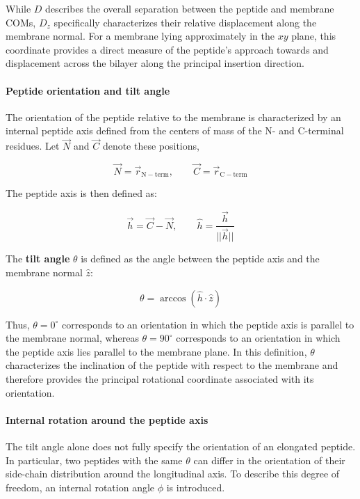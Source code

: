 While $D$ describes the overall separation between the peptide and membrane COMs, $D_z$ specifically characterizes their relative displacement along the membrane normal. For a membrane lying approximately in the $xy$ plane, this coordinate provides a direct measure of the peptide's approach towards and displacement across the bilayer along the principal insertion direction.

\paragraph{Peptide orientation and tilt angle}

The orientation of the peptide relative to the membrane is characterized by an internal peptide axis defined from the centers of mass of the N- and C-terminal residues. Let $\vec{N}$ and $\vec{C}$ denote these positions,

\begin{equation}
\vec{N} = \vec{r}_{\mathrm{N-term}},
\qquad
\vec{C} = \vec{r}_{\mathrm{C-term}}
\end{equation}

The peptide axis is then defined as:

\begin{equation}
\vec{h} = \vec{C}-\vec{N},
\qquad
\hat{h} = \frac{\vec{h}}{||\vec{h}||}
\end{equation}

The \textbf{tilt angle} $\theta$ is defined as the angle between the peptide axis and the membrane normal $\hat{z}$:

\begin{equation}
\theta =
\arccos\left(\hat{h}\cdot\hat{z}\right)
\end{equation}

Thus, $\theta=0^\circ$ corresponds to an orientation in which the peptide axis is parallel to the membrane normal, whereas $\theta=90^\circ$ corresponds to an orientation in which the peptide axis lies parallel to the membrane plane. In this definition, $\theta$ characterizes the inclination of the peptide with respect to the membrane and therefore provides the principal rotational coordinate associated with its orientation.

\paragraph{Internal rotation around the peptide axis}

The tilt angle alone does not fully specify the orientation of an elongated peptide. In particular, two peptides with the same $\theta$ can differ in the orientation of their side-chain distribution around the longitudinal axis. To describe this degree of freedom, an internal rotation angle $\phi$ is introduced.

